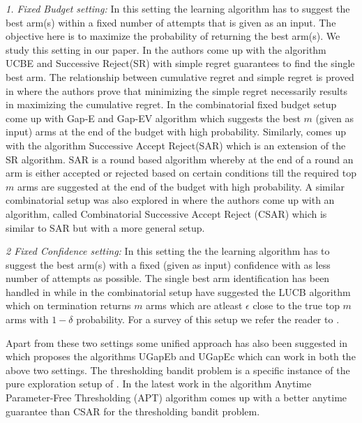 	\emph{1. Fixed Budget setting:} In this setting the learning algorithm has to suggest the best arm(s) within a fixed number of attempts that is given as an input. The objective here is to maximize the probability of returning the best arm(s).  We study this setting in our paper. In \cite{audibert2009exploration} the authors come up with the algorithm UCBE and Successive Reject(SR) with simple regret guarantees to find the single best arm. The relationship between cumulative regret and simple regret is proved in \cite{bubeck2011pure} where the authors prove that minimizing the simple regret necessarily results in maximizing the cumulative regret. In the combinatorial fixed budget setup \cite{gabillon2011multi} come up with Gap-E and Gap-EV algorithm which suggests the best $m$ (given as input) arms at the end of the budget with high probability. Similarly, \cite{bubeck2013multiple} comes up with the algorithm Successive Accept Reject(SAR) which is an extension of the SR algorithm. SAR is a round based algorithm whereby at the end of a round an arm is either accepted or rejected based on certain conditions till the required top $m$ arms are suggested at the end of the budget with high probability. A similar combinatorial setup was also explored in \cite{chen2014combinatorial} where the authors come up with an algorithm, called Combinatorial Successive Accept Reject (CSAR) which is similar to SAR but with a more general setup. 

	\emph{2 Fixed Confidence setting:} In this setting the the learning algorithm has to suggest the best arm(s) with a fixed (given as input) confidence with as less number of attempts as possible. The single best arm identification has been handled in \cite{even2006action} while in the combinatorial setup \cite{kalyanakrishnan2012pac} have suggested the LUCB algorithm which on termination returns $m$ arms which are atleast $\epsilon$ close to the true top $m$ arms with $1-\delta$ probability. For a survey of this setup we refer the reader to \cite{jamieson2014best}. 

	Apart from these two settings some unified approach has also been suggested in \cite{gabillon2012best} which proposes the algorithms UGapEb and UGapEc which can work in both the above two settings. The thresholding bandit problem is a specific instance of the pure exploration setup of \cite{chen2014combinatorial}. In the latest work in \cite{locatelli2016optimal} the algorithm Anytime Parameter-Free Thresholding (APT) algorithm comes up with a better anytime guarantee than CSAR for the thresholding bandit problem.	
	
